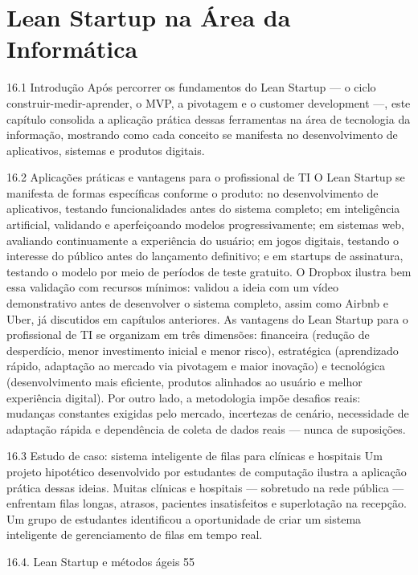 \chapter{Lean Startup na Área da Informática}

16.1 Introdução Após percorrer os fundamentos do Lean Startup — o ciclo construir-medir-aprender, o MVP, a pivotagem e o customer development —, este capítulo consolida a aplicação prática dessas ferramentas na área de tecnologia da informação, mostrando como cada conceito se manifesta no desenvolvimento de aplicativos, sistemas e produtos digitais.

16.2 Aplicações práticas e vantagens para o profissional de TI O Lean Startup se manifesta de formas específicas conforme o produto: no desenvolvimento de aplicativos, testando funcionalidades antes do sistema completo; em inteligência artificial, validando e aperfeiçoando modelos progressivamente; em sistemas web, avaliando continuamente a experiência do usuário; em jogos digitais, testando o interesse do público antes do lançamento definitivo; e em startups de assinatura, testando o modelo por meio de períodos de teste gratuito. O Dropbox ilustra bem essa validação com recursos mínimos: validou a ideia com um vídeo demonstrativo antes de desenvolver o sistema completo, assim como Airbnb e Uber, já discutidos em capítulos anteriores. As vantagens do Lean Startup para o profissional de TI se organizam em três dimensões: financeira (redução de desperdício, menor investimento inicial e menor risco), estratégica (aprendizado rápido, adaptação ao mercado via pivotagem e maior inovação) e tecnológica (desenvolvimento mais eficiente, produtos alinhados ao usuário e melhor experiência digital). Por outro lado, a metodologia impõe desafios reais: mudanças constantes exigidas pelo mercado, incertezas de cenário, necessidade de adaptação rápida e dependência de coleta de dados reais — nunca de suposições.

16.3 Estudo de caso: sistema inteligente de filas para clínicas e hospitais Um projeto hipotético desenvolvido por estudantes de computação ilustra a aplicação prática dessas ideias. Muitas clínicas e hospitais — sobretudo na rede pública — enfrentam filas longas, atrasos, pacientes insatisfeitos e superlotação na recepção. Um grupo de estudantes identificou a oportunidade de criar um sistema inteligente de gerenciamento de filas em tempo real.

16.4. Lean Startup e métodos ágeis 55

